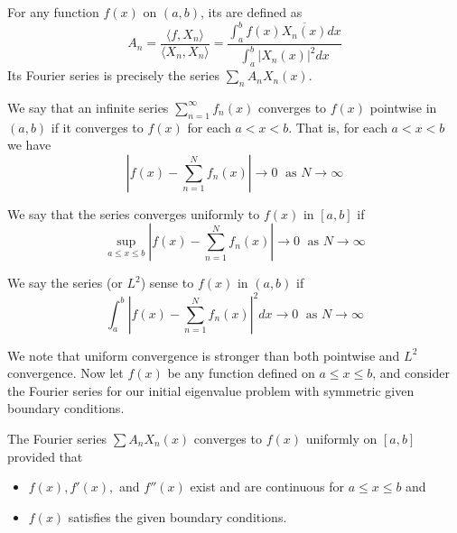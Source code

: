 \documentclass[12pt, a4paper, oneside, openright, titlepage]{book}
\begin{document}
\begin{defn}
    For any function $f(x)$ on $(a,b)$, its  are defined as 
    \begin{equation}
        \boxed{A_n = \frac{\langle f,X_n\rangle}{\langle X_n,X_n\rangle} = \frac{\int_a^bf(x)\overline{X_n(x)}dx}{\int_a^b|X_n(x)|^2dx}}
    \end{equation}
    Its Fourier series is precisely the series $\sum_nA_nX_n(x)$.
\end{defn}

\begin{defn}
    We say that an infinite series $\sum_{n=1}^{\infty}f_n(x)$ converges to $f(x)$ pointwise in $(a,b)$ if it converges to $f(x)$ for each $a < x < b$. That is, for each $a < x < b$ we have \begin{equation*}
        \left|f(x) - \sum_{n=1}^Nf_n(x)\right| \rightarrow 0\;\text{ as }N\rightarrow \infty
    \end{equation*}
\end{defn}

\begin{defn}
    We say that the series converges uniformly to $f(x)$ in $[a,b]$ if \begin{equation*}
        \sup\limits_{a\leq x \leq b}\left|f(x) - \sum_{n=1}^Nf_n(x)\right| \rightarrow 0\;\text{ as }N\rightarrow \infty
    \end{equation*}
\end{defn}

\begin{defn}
    We say the series  (or $L^2$) sense to $f(x)$ in $(a,b)$ if \begin{equation*}
        \int_a^b\left|f(x)-\sum_{n=1}^Nf_n(x)\right|^2dx \rightarrow 0\;\text{ as }N\rightarrow \infty
    \end{equation*}
\end{defn}

We note that uniform convergence is stronger than both pointwise and $L^2$ convergence. Now let $f(x)$ be any function defined on $a\leq x \leq b$, and consider the Fourier series for our initial eigenvalue problem with symmetric given boundary conditions.

\begin{thm}
    The Fourier series $\sum A_nX_n(x)$ converges to $f(x)$ uniformly on $[a,b]$ provided that \begin{itemize}
        \item $f(x),f'(x),$ and $f''(x)$ exist and are continuous for $a \leq x \leq b$ and 
        \item $f(x)$ satisfies the given boundary conditions.
    \end{itemize}
\end{thm}
\end{document}
